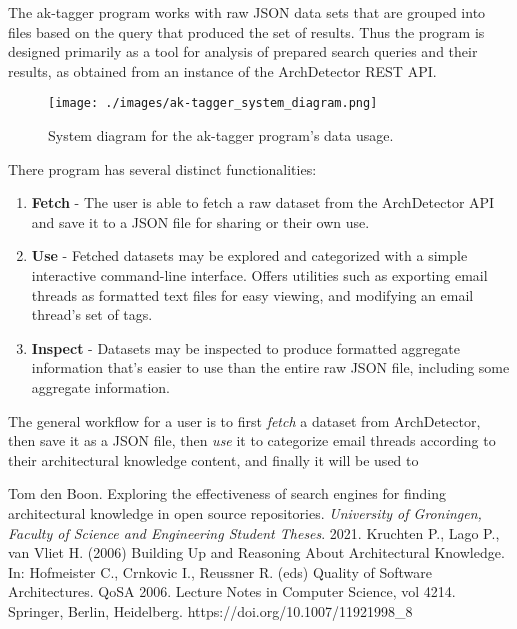 \documentclass{article}
\begin{document}
		The ak-tagger program works with raw JSON data sets that are grouped into files based on the query that produced the set of results. Thus the program is designed primarily as a tool for analysis of prepared search queries and their results, as obtained from an instance of the ArchDetector REST API.
		
		\begin{figure}
			\texttt{[image: ./images/ak-tagger\_system\_diagram.png]}
			\caption{System diagram for the ak-tagger program's data usage.}
		\end{figure}
		
		There program has several distinct functionalities:
		\begin{enumerate}
			\item \textbf{Fetch} - The user is able to fetch a raw dataset from the ArchDetector API and save it to a JSON file for sharing or their own use.
			\item \textbf{Use} - Fetched datasets may be explored and categorized with a simple interactive command-line interface. Offers utilities such as exporting email threads as formatted text files for easy viewing, and modifying an email thread's set of tags.
			\item \textbf{Inspect} - Datasets may be inspected to produce formatted aggregate information that's easier to use than the entire raw JSON file, including some aggregate information.
		\end{enumerate}
	
		The general workflow for a user is to first \textit{fetch} a dataset from ArchDetector, then save it as a JSON file, then \textit{use} it to categorize email threads according to their architectural knowledge content, and finally it will be used to
		


\begin{thebibliography}{99}
		Tom den Boon.
		Exploring the effectiveness of search engines for finding architectural knowledge in open source repositories.
		\textit{University of Groningen, Faculty of Science and Engineering Student Theses}.
		2021.
		Kruchten P., Lago P., van Vliet H. (2006) Building Up and Reasoning About Architectural Knowledge. In: Hofmeister C., Crnkovic I., Reussner R. (eds) Quality of Software Architectures. QoSA 2006. Lecture Notes in Computer Science, vol 4214. Springer, Berlin, Heidelberg. https://doi.org/10.1007/11921998\_8
\end{thebibliography}
\end{document}
